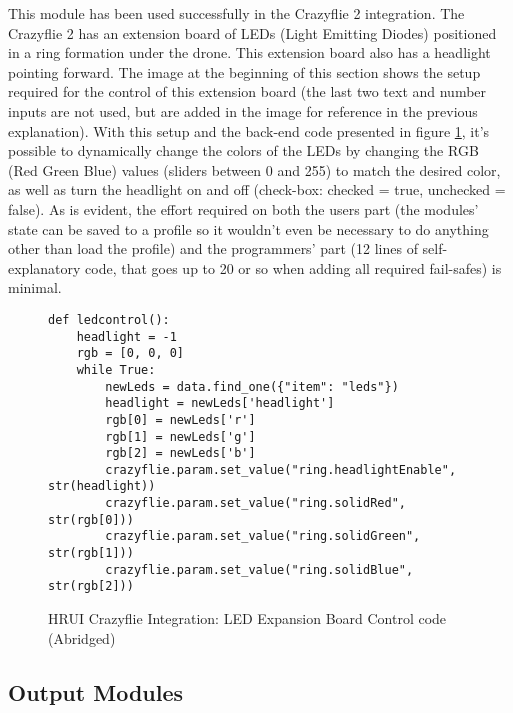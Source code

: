 This module has been used successfully in the Crazyflie 2 integration. The Crazyflie 2 has an extension board of LEDs (Light 
Emitting Diodes) positioned in a ring formation under the drone. This extension board also has a headlight pointing forward. 
The image at the beginning of this section shows the setup required for the control of this extension board (the last two text 
and number inputs are not used, but are added in the image for reference in the previous explanation). With this setup and the 
back-end code presented in figure \ref{ledcode}, it's possible to dynamically change the colors of the LEDs by changing the 
RGB (Red Green Blue) values (sliders between 0 and 255) to match the desired color, as well as turn the headlight on and off 
(check-box: checked = true, unchecked = false). As is evident, the effort required on both the users part (the modules' state 
can be saved to a profile so it wouldn't even be necessary to do anything other than load the profile) and the programmers' 
part (12 lines of self-explanatory code, that goes up to 20 or so when adding all required fail-safes) is minimal.
\begin{figure}[H]
\captionsetup{justification=centering}
\begin{verbatim}
def ledcontrol():
	headlight = -1
	rgb = [0, 0, 0]
	while True:
		newLeds = data.find_one({"item": "leds"})
		headlight = newLeds['headlight']
		rgb[0] = newLeds['r']
		rgb[1] = newLeds['g']
		rgb[2] = newLeds['b']                
		crazyflie.param.set_value("ring.headlightEnable", str(headlight))                
		crazyflie.param.set_value("ring.solidRed", str(rgb[0]))                
		crazyflie.param.set_value("ring.solidGreen", str(rgb[1]))                
		crazyflie.param.set_value("ring.solidBlue", str(rgb[2]))
\end{verbatim}
\caption{HRUI Crazyflie Integration: LED Expansion Board Control code (Abridged)\label{ledcode}}
\end{figure}
\subsection{Output Modules}
